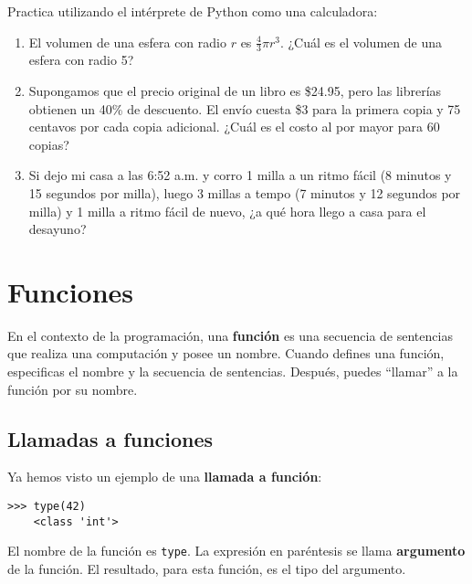 \documentclass[10pt]{book}
\begin{document}
\begin{exercise}

Practica utilizando el intérprete de Python como una calculadora:

\begin{enumerate}

\item El volumen de una esfera con radio $r$ es $\frac{4}{3} \pi r^3$.
  ¿Cuál es el volumen de una esfera con radio 5?

\item Supongamos que el precio original de un libro es \$24.95, pero las librerías obtienen
  un 40\% de descuento.  El envío cuesta \$3 para la primera copia y 75 centavos
  por cada copia adicional.  ¿Cuál es el costo al por mayor para
  60 copias?

\item Si dejo mi casa a las 6:52 a.m. y corro 1 milla a un ritmo fácil
  (8 minutos y 15 segundos por milla), luego 3 millas a tempo (7 minutos y 12 segundos por milla) y 1 milla
  a ritmo fácil de nuevo, ¿a qué hora llego a casa para el desayuno?

\end{enumerate}
\end{exercise}


\chapter{Funciones}
\label{funcchap}

En el contexto de la programación, una {\bf función} es una secuencia de sentencias
que realiza una computación y posee un nombre.  Cuando defines una función,
especificas el nombre y la secuencia de sentencias.  Después, puedes
``llamar'' a la función por su nombre.

\section{Llamadas a funciones}
\label{functionchap}

Ya hemos visto un ejemplo de una {\bf llamada a función}:

\begin{verbatim}
>>> type(42)
    <class 'int'>
\end{verbatim}
%
El nombre de la función es {\tt type}.  La expresión en paréntesis
se llama {\bf argumento} de la función.  El resultado, para esta
función, es el tipo del argumento.
\end{document}
